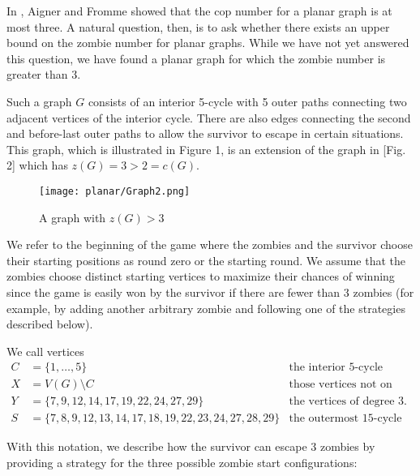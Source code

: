 In \cite{aigner1984game}, Aigner and Fromme showed that the cop number for a planar graph is at most three.
A natural question, then, is to ask whether there exists an upper bound on the zombie number for planar graphs.
While we have not yet answered this question, we have found a planar graph for which the zombie number is greater than 3.

Such a graph $G$ consists of an interior 5-cycle with 5 outer paths connecting two adjacent vertices of the interior cycle.
There are also edges connecting the second and before-last outer paths to allow the survivor to escape in certain situations.
This graph, which is illustrated in Figure 1, is an extension of the graph in \cite{fitzpatrick2016deterministic}[Fig. 2] which has
$z(G) = 3 > 2 = c(G)$.


\begin{figure}[H]
\centering
\texttt{[image: planar/Graph2.png]}
\caption{A graph with $z(G) > 3$} \label{fig:planarG1}
\end{figure}

We refer to the beginning of the game where the zombies and the survivor choose their starting positions as round zero or the starting round.
We assume that the zombies choose distinct starting vertices to maximize their chances of winning since the game is easily won by the survivor
if there are fewer than 3 zombies (for example, by adding another arbitrary zombie and following one of the strategies described below).


We call vertices
\begin{align*}
C &= \{ 1, \dots, 5 \} & \text{the interior 5-cycle} \\
X &= V(G) \setminus C & \text{those vertices not on the interior 5-cycle} \\
Y &= \{7, 9, 12, 14, 17, 19, 22, 24, 27, 29\} & \text{the vertices of degree 3.} \\
S &= \{ 7,8,9,12,13,14,17,18,19, 22,23,24,27,28,29 \} & \text{the outermost 15-cycle}
\end{align*}

With this notation, we describe how the survivor can escape 3 zombies by providing a strategy for the three possible zombie start configurations:

